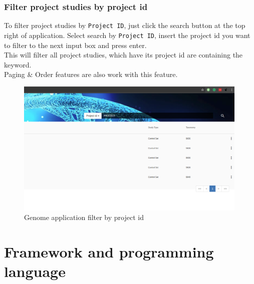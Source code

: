 \documentclass[a4paper,12pt]{article}
\begin{document}
\subsubsection{Filter project studies by project id} 
To filter project studies by \texttt{Project ID}, just click the search button at the top right of application. Select search by \texttt{Project ID}, insert the project id you want to filter to the next input box and press enter.\\
This will filter all project studies, which have its project id are containing the keyword.\\
Paging \& Order features are also work with this feature.

\begin{figure}[H]
\centering
\includegraphics[width=0.99\textwidth]{images/genome-filter-projectid}
\caption{Genome application filter by project id}
\end{figure}


\section{Framework and programming language}
\end{document}

